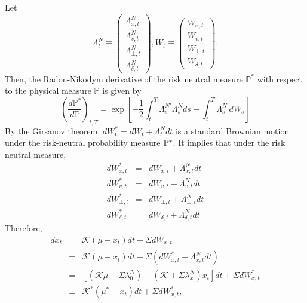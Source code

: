 \documentclass{article}
\begin{document}
Let 
\begin{equation*}
\Lambda _{t}^{N}\equiv \left( 
\begin{array}{c}
\Lambda _{x,t}^{N} \\ 
\Lambda _{v,t}^{N} \\ 
\Lambda _{\bot ,t}^{N} \\ 
\Lambda _{\delta ,t}^{N}%
\end{array}%
\right) ,W_{t}\equiv \left( 
\begin{array}{c}
W_{x,t} \\ 
W_{v,t} \\ 
W_{\bot ,t} \\ 
W_{\delta ,t}%
\end{array}%
\right) .
\end{equation*}%
Then, the Radon-Nikodym derivative of the risk neutral measure $\mathbb{P}%
^{\ast }$ with respect to the physical measure $\mathbb{P}$ is given by%
\begin{equation}
\left( \frac{d\mathbb{P}^{\ast }}{d\mathbb{P}}\right) _{t,T}=\exp \left[ -%
\frac{1}{2}\int_{t}^{T}\Lambda _{s}^{N\prime }\Lambda
_{s}^{N}ds-\int_{t}^{T}\Lambda _{s}^{N\prime }dW_{s}\right] 
\end{equation}%
By the Girsanov theorem, $dW_{t}^{\ast }=dW_{t}+\Lambda _{t}^{N}dt$ is a
standard Brownian motion under the risk-neutral probability measure $\mathbb{%
P}^{\ast }$. It implies that under the risk neutral measure, 
\begin{eqnarray*}
dW_{x,t}^{\ast } &=&dW_{x,t}+\Lambda _{x,t}^{N}dt \\
dW_{v,t}^{\ast } &=&dW_{v,t}+\Lambda _{v,t}^{N}dt \\
dW_{\bot ,t}^{\ast } &=&dW_{\bot ,t}+\Lambda _{\bot ,t}^{N}dt \\
dW_{\delta ,t}^{\ast } &=&dW_{\delta ,t}+\Lambda _{\delta ,t}^{N}dt
\end{eqnarray*}%
Therefore,%
\begin{eqnarray*}
dx_{t} &=&\mathcal{K}\left( \mu -x_{t}\right) dt+\Sigma dW_{x,t} \\
&=&\mathcal{K}\left( \mu -x_{t}\right) dt+\Sigma \left( dW_{x,t}^{\ast
}-\Lambda _{x,t}^{N}dt\right)  \\
&=&\left[ \left( \mathcal{K}\mu -\Sigma \lambda _{0}^{N}\right) -\left( 
\mathcal{K}+\Sigma \lambda _{x}^{N}\right) x_{t}\right] dt+\Sigma
dW_{x,t}^{\ast } \\
&\equiv &\mathcal{K}^{\ast }\left( \mu ^{\ast }-x_{t}\right) dt+\Sigma
dW_{x,t}^{\ast },
\end{eqnarray*}%
\end{document}
